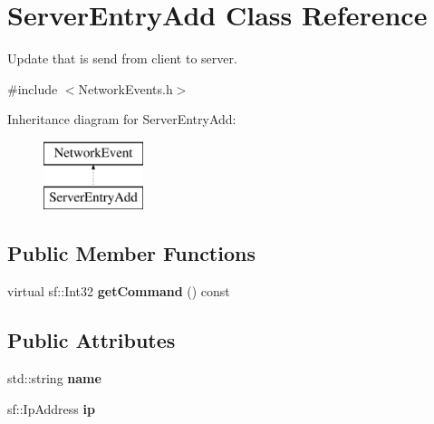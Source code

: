 \hypertarget{class_server_entry_add}{\section{Server\-Entry\-Add Class Reference}
\label{class_server_entry_add}
}


Update that is send from client to server.  




{\ttfamily \#include $<$Network\-Events.\-h$>$}

Inheritance diagram for Server\-Entry\-Add\-:\begin{figure}[H]
\begin{center}
\leavevmode
\includegraphics[height=2.000000cm]{class_server_entry_add}
\end{center}
\end{figure}
\subsection*{Public Member Functions}
\begin{DoxyCompactItemize}
\item 
\hypertarget{class_server_entry_add_a90f0f983cafdd6f4cbde987aaa9eaab8}{virtual sf\-::\-Int32 {\bfseries get\-Command} () const }\label{class_server_entry_add_a90f0f983cafdd6f4cbde987aaa9eaab8}

\end{DoxyCompactItemize}
\subsection*{Public Attributes}
\begin{DoxyCompactItemize}
\item 
\hypertarget{class_server_entry_add_aeb277ba2fcd76c69f67b36e32d270fa9}{std\-::string {\bfseries name}}\label{class_server_entry_add_aeb277ba2fcd76c69f67b36e32d270fa9}

\item 
\hypertarget{class_server_entry_add_a9d868e1b9ee3075061be55fd9195568d}{sf\-::\-Ip\-Address {\bfseries ip}}\label{class_server_entry_add_a9d868e1b9ee3075061be55fd9195568d}

\end{DoxyCompactItemize}
